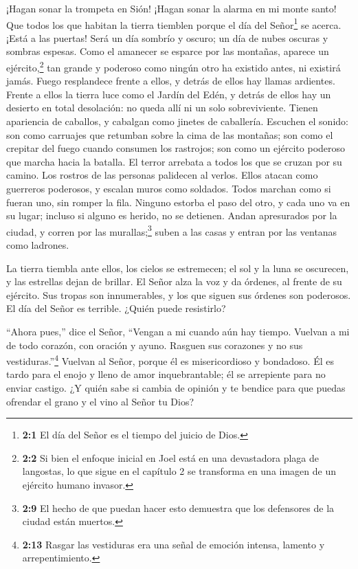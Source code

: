  ¡Hagan sonar la trompeta en Sión! ¡Hagan sonar la alarma en
mi monte santo! Que todos los que habitan la tierra tiemblen porque el
día del Señor\footnote{\textbf{2:1} El día del Señor es el tiempo del
  juicio de Dios.} se acerca. ¡Está a las puertas!  Será un
día sombrío y oscuro; un día de nubes oscuras y sombras espesas. Como el
amanecer se esparce por las montañas, aparece un ejército,\footnote{\textbf{2:2}
  Si bien el enfoque inicial en Joel está en una devastadora plaga de
  langostas, lo que sigue en el capítulo 2 se transforma en una imagen
  de un ejército humano invasor.} tan grande y poderoso como ningún otro
ha existido antes, ni existirá jamás.  Fuego resplandece
frente a ellos, y detrás de ellos hay llamas ardientes. Frente a ellos
la tierra luce como el Jardín del Edén, y detrás de ellos hay un
desierto en total desolación: no queda allí ni un solo sobreviviente.
 Tienen apariencia de caballos, y cabalgan como jinetes de
caballería.  Escuchen el sonido: son como carruajes que
retumban sobre la cima de las montañas; son como el crepitar del fuego
cuando consumen los rastrojos; son como un ejército poderoso que marcha
hacia la batalla.  El terror arrebata a todos los que se
cruzan por su camino. Los rostros de las personas palidecen al verlos.
 Ellos atacan como guerreros poderosos, y escalan muros como
soldados. Todos marchan como si fueran uno, sin romper la fila.
 Ninguno estorba el paso del otro, y cada uno va en su
lugar; incluso si alguno es herido, no se detienen.  Andan
apresurados por la ciudad, y corren por las murallas;\footnote{\textbf{2:9}
  El hecho de que puedan hacer esto demuestra que los defensores de la
  ciudad están muertos.} suben a las casas y entran por las ventanas
como ladrones.

 La tierra tiembla ante ellos, los cielos se estremecen; el
sol y la luna se oscurecen, y las estrellas dejan de brillar.
 El Señor alza la voz y da órdenes, al frente de su
ejército. Sus tropas son innumerables, y los que siguen sus órdenes son
poderosos. El día del Señor es terrible. ¿Quién puede resistirlo?

 ``Ahora pues,'' dice el Señor, ``Vengan a mi cuando aún
hay tiempo. Vuelvan a mi de todo corazón, con oración y ayuno.
 Rasguen sus corazones y no sus vestiduras.''\footnote{\textbf{2:13}
  Rasgar las vestiduras era una señal de emoción intensa, lamento y
  arrepentimiento.} Vuelvan al Señor, porque él es misericordioso y
bondadoso. Él es tardo para el enojo y lleno de amor inquebrantable; él
se arrepiente para no enviar castigo.  ¿Y quién sabe si
cambia de opinión y te bendice para que puedas ofrendar el grano y el
vino al Señor tu Dios?

